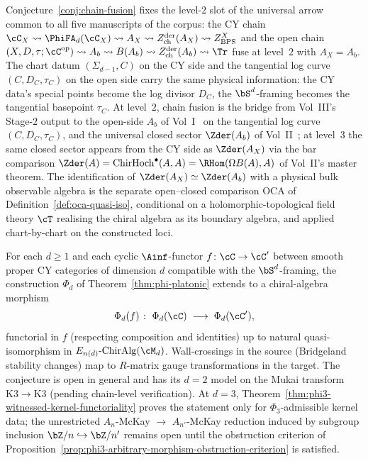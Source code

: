 \begin{remark}
\label{rem:chain-fusion-level-2-arrow}
Conjecture~\ref{conj:chain-fusion} fixes the level-$2$ slot of the
universal arrow common to all five manuscripts of the corpus: the CY
chain $\cC_X \rightsquigarrow \PhiFA_d(\cC_X) \rightsquigarrow A_X
\rightsquigarrow Z^{\mathrm{der}}_{\mathrm{ch}}(A_X) \rightsquigarrow
Z_{\mathrm{BPS}}^X$ and the open chain
$(X, D, \tau; \cC^{\mathrm{op}}) \rightsquigarrow A_b \rightsquigarrow
B(A_b) \rightsquigarrow Z^{\mathrm{der}}_{\mathrm{ch}}(A_b)
\rightsquigarrow \Tr$ fuse at level~$2$ with $A_X = A_b$. The chart
datum $(\Sigma_{d-1}, C)$ on the CY side and the tangential log curve
$(C, D_C, \tau_C)$ on the open side carry the same physical
information: the CY data's special points become the log divisor
$D_C$, the $\bS^d$-framing becomes the tangential basepoint $\tau_C$.
At level~$2$, chain fusion is the bridge from Vol~III's Stage-$2$
output to the open-side $A_b$ of Vol~I~\cite{VolI} on the tangential
log curve $(C, D_C, \tau_C)$, and the universal closed sector
$\Zder(A_b)$ of Vol~II~\cite{VolII}; at level~$3$ the same closed
sector appears from the CY side as $\Zder(A_X)$ via the bar comparison
$\Zder(A) = \mathrm{ChirHoch}^\bullet(A, A) = \RHom(\Omega B(A), A)$
 of Vol~II's master theorem. The identification of $\Zder(A_X) \simeq \Zder(A_b)$ with a physical bulk observable algebra is the separate open--closed comparison $\mathrm{OCA}$ of Definition~\ref{def:oca-quasi-iso}, conditional on a holomorphic-topological field theory $\cT$ realising the chiral algebra as its boundary algebra, and applied chart-by-chart on the constructed loci.
\end{remark}

\begin{conjecture}
\label{conj:phi-d-functoriality}
\ClaimStatusConjectured
For each $d \geq 1$ and each cyclic $\Ainf$-functor $f \colon \cC \to \cC'$ between smooth proper CY categories of dimension $d$ compatible with the $\bS^d$-framing, the construction $\Phi_d$ of Theorem~\textup{\ref{thm:phi-platonic}} extends to a chiral-algebra morphism
\[
 \Phi_d(f) \;\colon\; \Phi_d(\cC) \;\longrightarrow\; \Phi_d(\cC'),
\]
functorial in $f$ \textup{(}respecting composition and identities\textup{)} up to natural quasi-isomorphism in $E_{n(d)}\text{-}\mathrm{ChirAlg}(\cM_d)$. Wall-crossings in the source \textup{(}Bridgeland stability changes\textup{)} map to $R$-matrix gauge transformations in the target. The conjecture is open in general and has its \(d=2\) model on the Mukai transform $\mathrm{K3} \to \mathrm{K3}$ \textup{(}pending chain-level verification\textup{)}. At $d = 3$, Theorem~\ref{thm:phi3-witnessed-kernel-functoriality} proves the statement only for $\Phi_3$-admissible kernel data; the unrestricted $A_n$-McKay $\to$ $A_{n'}$-McKay reduction induced by subgroup inclusion $\bZ/n \hookrightarrow \bZ/n'$ remains open until the obstruction criterion of Proposition~\ref{prop:phi3-arbitrary-morphism-obstruction-criterion} is satisfied.
\end{conjecture}

